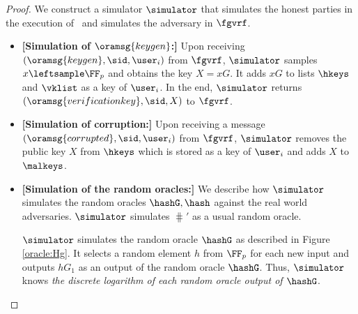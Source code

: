 \begin{proof}
	We construct a simulator $ \simulator $ that simulates the honest parties in the execution of \name \ and simulates the adversary in $ \fgvrf $. 
	\begin{itemize}
		
		\item \textbf{[Simulation of $ \oramsg{keygen} $:]} Upon receiving $(\oramsg{keygen}, \sid, \user_i)$ from $\fgvrf$, $ \simulator $ samples $x \leftsample \FF_p$ and obtains the key $X = xG$. It adds $ xG $ to lists $ \hkeys $ and $ \vklist $ as a key of $ \user_i $. 
		In the end, $ \simulator $ returns $(\oramsg{verificationkey}, \sid, X)$ to $\fgvrf$. %
		
		\item \textbf{[Simulation of corruption:]} Upon receiving a message $ (\oramsg{corrupted}, \sid, \user_i) $ from $ \fgvrf $, $ \simulator $ removes the public key $ X $ from $ \hkeys $ which is stored as a key of $ \user_i $ and adds $ X $ to $ \malkeys $.
		
		\item\textbf{[Simulation of the random oracles:]} We  describe how $ \simulator $ simulates the random oracles $ \hashG, \hash $ against the real world adversaries. 	$ \simulator $ simulates  $ \hash' $  as a usual random oracle.
		
		
		$ \simulator $ simulates the random oracle $ \hashG $ as described in Figure \ref{oracle:Hg}. It selects a random element  $ h $ from $ \FF_p $ for each new input and outputs $ hG_1 $ as an output of the random oracle $ \hashG $. Thus, $ \simulator $ knows \emph{the discrete logarithm of each random oracle output of $\hashG  $}. 
		\begin{figure}
			\centering
			
			\noindent{}
\end{figure}
\end{itemize}
\end{proof}
